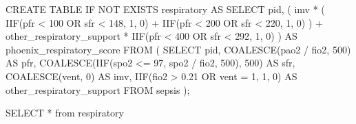 \documentclass[
  letterpaper,
  DIV=11,
  numbers=noendperiod]{scrartcl}
\newenvironment{Shaded}{\begin{snugshade}}{\end{snugshade}}
\newcommand{\ControlFlowTok}[1]{\textcolor[rgb]{0.00,0.23,0.31}{#1}}
\newcommand{\DecValTok}[1]{\textcolor[rgb]{0.68,0.00,0.00}{#1}}
\newcommand{\FloatTok}[1]{\textcolor[rgb]{0.68,0.00,0.00}{#1}}
\newcommand{\FunctionTok}[1]{\textcolor[rgb]{0.28,0.35,0.67}{#1}}
\newcommand{\KeywordTok}[1]{\textcolor[rgb]{0.00,0.23,0.31}{#1}}
\newcommand{\NormalTok}[1]{\textcolor[rgb]{0.00,0.23,0.31}{#1}}
\newcommand{\OperatorTok}[1]{\textcolor[rgb]{0.37,0.37,0.37}{#1}}
\begin{document}
\begin{Shaded}
\begin{Highlighting}[]
\KeywordTok{CREATE} \KeywordTok{TABLE} \ControlFlowTok{IF} \KeywordTok{NOT} \KeywordTok{EXISTS}\NormalTok{ respiratory }\KeywordTok{AS}
  \KeywordTok{SELECT}
\NormalTok{    pid,}
\NormalTok{    (}
\NormalTok{      imv }\OperatorTok{*}\NormalTok{ (}
\NormalTok{        IIF(pfr }\OperatorTok{\textless{}} \DecValTok{100} \KeywordTok{OR}\NormalTok{ sfr }\OperatorTok{\textless{}} \DecValTok{148}\NormalTok{, }\DecValTok{1}\NormalTok{, }\DecValTok{0}\NormalTok{) }\OperatorTok{+}\NormalTok{ IIF(pfr }\OperatorTok{\textless{}} \DecValTok{200} \KeywordTok{OR}\NormalTok{ sfr }\OperatorTok{\textless{}} \DecValTok{220}\NormalTok{, }\DecValTok{1}\NormalTok{, }\DecValTok{0}\NormalTok{)}
\NormalTok{      ) }\OperatorTok{+}
\NormalTok{      other\_respiratory\_support }\OperatorTok{*}\NormalTok{ IIF(pfr }\OperatorTok{\textless{}} \DecValTok{400} \KeywordTok{OR}\NormalTok{ sfr }\OperatorTok{\textless{}} \DecValTok{292}\NormalTok{, }\DecValTok{1}\NormalTok{, }\DecValTok{0}\NormalTok{)}
\NormalTok{    ) }\KeywordTok{AS}\NormalTok{ phoenix\_respiratory\_score}
  \KeywordTok{FROM}
\NormalTok{  (}
    \KeywordTok{SELECT}
\NormalTok{      pid,}
      \FunctionTok{COALESCE}\NormalTok{(pao2 }\OperatorTok{/}\NormalTok{ fio2, }\DecValTok{500}\NormalTok{) }\KeywordTok{AS}\NormalTok{ pfr,}
      \FunctionTok{COALESCE}\NormalTok{(IIF(spo2 }\OperatorTok{\textless{}=} \DecValTok{97}\NormalTok{, spo2 }\OperatorTok{/}\NormalTok{ fio2, }\DecValTok{500}\NormalTok{), }\DecValTok{500}\NormalTok{) }\KeywordTok{AS}\NormalTok{ sfr,}
      \FunctionTok{COALESCE}\NormalTok{(vent, }\DecValTok{0}\NormalTok{) }\KeywordTok{AS}\NormalTok{ imv,}
\NormalTok{      IIF(fio2 }\OperatorTok{\textgreater{}} \FloatTok{0.21} \KeywordTok{OR}\NormalTok{ vent }\OperatorTok{=} \DecValTok{1}\NormalTok{, }\DecValTok{1}\NormalTok{, }\DecValTok{0}\NormalTok{) }\KeywordTok{AS}\NormalTok{ other\_respiratory\_support}
    \KeywordTok{FROM}\NormalTok{ sepsis}
\NormalTok{  );}
\end{Highlighting}
\end{Shaded}

\begin{Shaded}
\begin{Highlighting}[]
\KeywordTok{SELECT} \OperatorTok{*} \KeywordTok{from}\NormalTok{ respiratory}
\end{Highlighting}
\end{Shaded}
\end{document}
